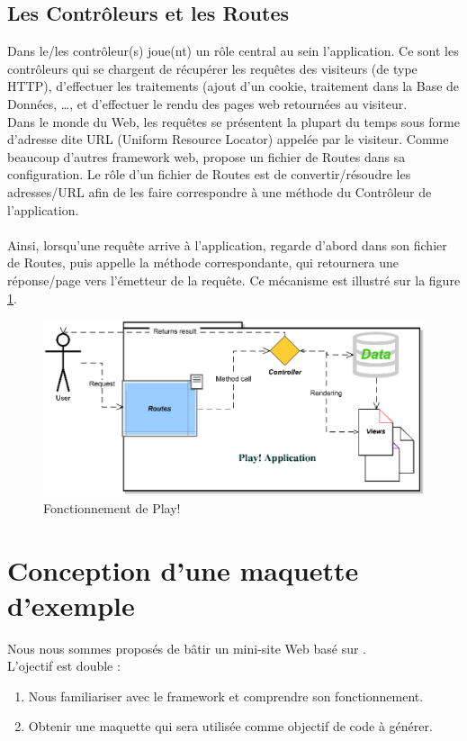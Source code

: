 \subsection{Les Contrôleurs et les Routes}
Dans \kwplay{} le/les contrôleur(s) joue(nt) un rôle central au sein l'application. Ce sont les contrôleurs qui se chargent de récupérer les requêtes des visiteurs (de type HTTP), d'effectuer les traitements (ajout d'un cookie, traitement dans la Base de Données, \dots, et d'effectuer le rendu des pages web retournées au visiteur.\\
Dans le monde du Web, les requêtes se présentent la plupart du temps sous forme d'adresse dite URL (Uniform Resource Locator) appelée par le visiteur. Comme beaucoup d'autres framework web, \kwplay{} propose un fichier de Routes dans sa configuration. Le rôle d'un fichier de Routes est de convertir/résoudre les adresses/URL afin de les faire correspondre à une méthode du Contrôleur de l'application.\\\\
Ainsi, lorsqu'une requête arrive à l'application, \kwplay{} regarde d'abord dans son fichier de Routes, puis appelle la méthode correspondante, qui retournera une réponse/page vers l'émetteur de la requête. Ce mécanisme est illustré sur la figure \ref{fig:play_sch}.

\begin{figure}[htb]
  \centering
  \includegraphics[scale=.8]{img/play_scheme.eps}
  \caption{Fonctionnement de Play!}
  \label{fig:play_sch}
\end{figure}

\section{Conception d’une maquette d’exemple}\label{sec:pro}

Nous nous sommes proposés de bâtir un mini-site Web basé sur \kwplay{}.
\\
L'ojectif est double :
\begin{enumerate}
\item Nous familiariser avec le framework \kwplay{} et comprendre son fonctionnement.
\item Obtenir une maquette qui sera utilisée comme objectif de code à générer.
\end{enumerate}

